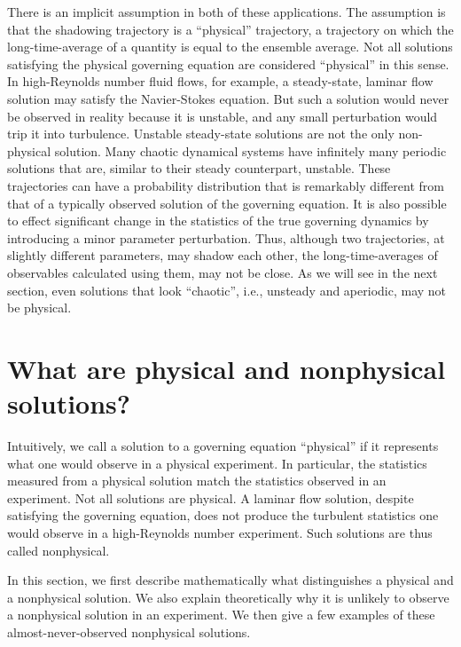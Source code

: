 There is an implicit assumption in both of these applications.  The assumption is that
the shadowing trajectory is a ``physical'' trajectory, a trajectory on which
the long-time-average of a quantity is equal to the ensemble average.
Not all solutions satisfying the physical governing equation are considered ``physical''
in this sense.  In high-Reynolds number fluid flows, for example, a steady-state, laminar flow solution may satisfy the Navier-Stokes equation. But such a solution would never be observed in reality because it is unstable, and any small perturbation
would trip it into turbulence. Unstable steady-state solutions are not the only
non-physical solution. Many chaotic dynamical systems have infinitely many periodic
solutions that are, similar to their steady counterpart, unstable. These trajectories can have a probability distribution that is remarkably different from that of a typically observed solution of the governing equation. It is also possible to effect significant change in the statistics of the true governing dynamics by introducing a minor parameter perturbation. Thus, although two trajectories, at slightly different parameters, may shadow each other, the long-time-averages of observables calculated using them, may not be close.    
As we will see
in the next section, even solutions that look ``chaotic'', i.e., unsteady and aperiodic, may not be physical. 

\section{What are physical and nonphysical solutions?}

Intuitively, we call a solution to a governing equation ``physical'' if
it represents what one would observe in a physical experiment.  In particular, the statistics measured from a physical solution match the statistics observed
in an experiment.   Not all solutions are physical.  A laminar flow
solution, despite satisfying the governing equation, does not produce the
turbulent statistics one would observe in a high-Reynolds number experiment. Such solutions are thus called nonphysical.

In this section, we first describe mathematically what distinguishes a physical
and a nonphysical solution.  We also explain theoretically why it is unlikely
to observe a nonphysical solution in an experiment.  We then give a few
examples of these almost-never-observed nonphysical solutions.

